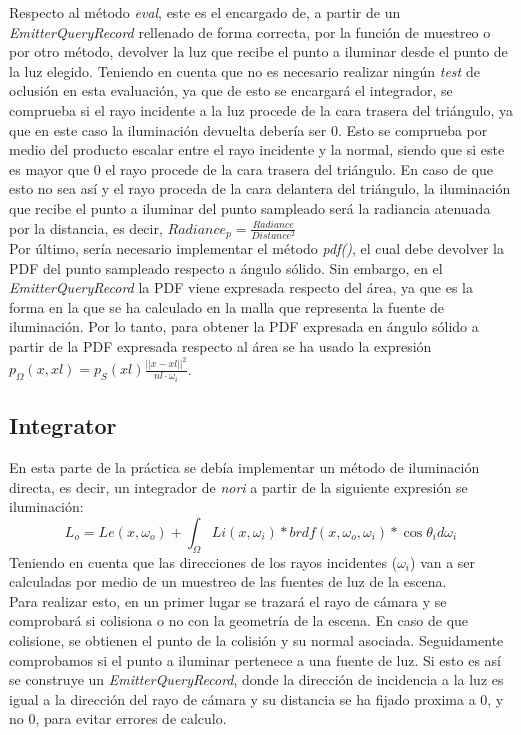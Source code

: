 \documentclass[10pt,oneside,a4paper]{article}
\begin{document}
Respecto al método \textit{eval}, este es el encargado de, a partir de un \textit{EmitterQueryRecord} rellenado de forma correcta, por la función de muestreo o por otro método, devolver la luz que recibe el punto a iluminar desde el punto de la luz elegido. Teniendo en cuenta que no es necesario realizar ningún \textit{test} de oclusión en esta evaluación, ya que de esto se encargará el integrador, se comprueba si el rayo incidente a la luz procede de la cara trasera del triángulo, ya que en este caso la iluminación devuelta debería ser 0. Esto se comprueba por medio del producto escalar entre el rayo incidente y la normal, siendo que si este es mayor que 0 el rayo procede de la cara trasera del triángulo. En caso de que esto no sea así y el rayo proceda de la cara delantera del triángulo, la iluminación que recibe el punto a iluminar del punto sampleado será la radiancia atenuada por la distancia, es decir, $Radiance_p = \frac{Radiance}{Distance^2}$\\

Por último, sería necesario implementar el método \textit{pdf()}, el cual debe devolver la PDF del punto sampleado respecto a ángulo sólido. Sin embargo, en el \textit{EmitterQueryRecord} la PDF viene expresada respecto del área, ya que es la forma en la que se ha calculado en la malla que representa la fuente de iluminación. Por lo tanto, para obtener la PDF expresada en ángulo sólido a partir de la PDF expresada respecto al área se ha usado la expresión $p_\Omega(x,xl) = p_S(xl)\frac{||x-xl||^2}{nl\cdot\omega_i}$.\\

\subsection{Integrator}
En esta parte de la práctica se debía implementar un método de iluminación directa, es decir, un integrador de \textit{nori} a partir de la siguiente expresión se iluminación:
$$L_o = Le(x,\omega_o) + \int_\Omega Li(x,\omega_i) * brdf(x,\omega_o,\omega_i)  * \cos\theta_i d\omega_i$$
Teniendo en cuenta que las direcciones de los rayos incidentes ($\omega_i$) van a ser calculadas por medio de un muestreo de las fuentes de luz de la escena.\\

Para realizar esto, en un primer lugar se trazará el rayo de cámara y se comprobará si colisiona o no con la geometría de la escena. En caso de que colisione, se obtienen el punto de la colisión y su normal asociada. Seguidamente comprobamos si el punto a iluminar pertenece a una fuente de luz. Si esto es así se construye un \textit{EmitterQueryRecord}, donde la dirección de incidencia a la luz es igual a la dirección del rayo de cámara y su distancia se ha fijado proxima a 0, y no 0, para evitar errores de calculo.\\
\end{document}
